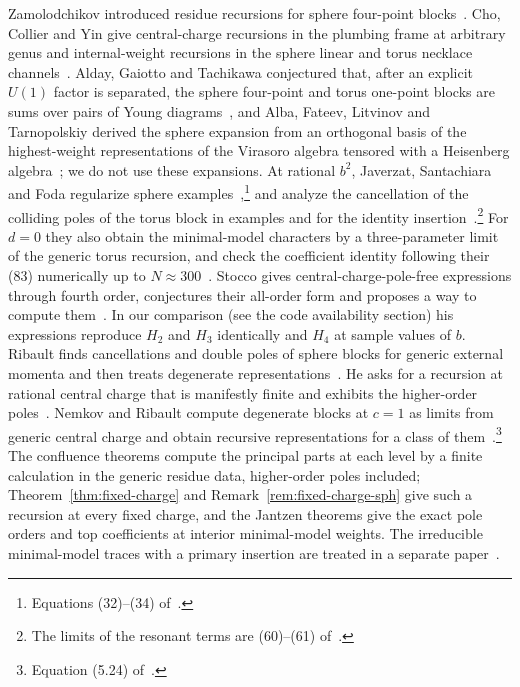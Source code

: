 \documentclass[twoside,10pt]{article}
\numberwithin{equation}{section}
\theoremstyle{slbody}
\theoremstyle{definition}
\theoremstyle{remark}
\begin{document}
Zamolodchikov introduced residue recursions for sphere four-point
blocks~\cite{Zamolodchikov1984,Zamolodchikov1987}.  Cho, Collier and Yin give
central-charge recursions in the plumbing frame at arbitrary genus and
internal-weight recursions in the sphere linear and torus necklace
channels~\cite{ChoCollierYin2017}.  Alday, Gaiotto and Tachikawa conjectured
that, after an explicit \(U(1)\) factor is separated, the sphere four-point
and torus one-point blocks are sums over pairs of Young
diagrams~\cite[\S\S3.2--3.3]{AldayGaiottoTachikawa2010}, and Alba, Fateev,
Litvinov and Tarnopolskiy derived the sphere expansion from an orthogonal
basis of the highest-weight representations of the Virasoro algebra tensored
with a Heisenberg algebra~\cite[Proposition~2.1, (1.9)
and~(1.11)--(1.12)]{AlbaFateevLitvinovTarnopolskiy2011}; we do not use these
expansions.  At rational \(b^2\), Javerzat,
Santachiara and Foda regularize sphere
examples~\cite[\S\S3.4--3.6]{JaverzatSantachiaraFoda2018},\footnote{Equations (32)--(34) of~\cite{JaverzatSantachiaraFoda2018}.}
and analyze the cancellation of the colliding poles of the torus block in
examples and for the identity
insertion~\cite[\S\S4--6]{JaverzatSantachiaraFoda2018}.\footnote{The limits of the resonant terms are (60)--(61) of~\cite{JaverzatSantachiaraFoda2018}.}
For \(d=0\) they also obtain the minimal-model characters by a
three-parameter limit of the generic torus recursion, and check the
coefficient identity following their (83) numerically up to
\(N\approx300\)~\cite[\S5]{JaverzatSantachiaraFoda2018}.
Stocco gives central-charge-pole-free expressions through fourth order,
conjectures their all-order form and proposes a way to compute
them~\cite[\S\S II.B--II.C and Appendix~A]{Stocco2022}.  In our comparison
(see the code availability section) his expressions reproduce \(H_2\) and
\(H_3\) identically and \(H_4\) at sample values of \(b\).  Ribault finds
cancellations and double poles of sphere blocks for generic external momenta
and then treats degenerate representations~\cite[\S\S3.2--3.3]{Ribault2019}.
He asks for a recursion at rational central charge that is manifestly finite
and exhibits the higher-order poles~\cite[end of \S3.2]{Ribault2019}.  Nemkov
and Ribault compute degenerate blocks at \(c=1\) as limits from generic
central charge and obtain recursive representations for a class of
them~\cite[\S5.2]{NemkovRibault2021}.\footnote{Equation (5.24)
of~\cite{NemkovRibault2021}.}  The confluence theorems compute the principal parts at each level by a finite
calculation in the generic residue data, higher-order poles included;
Theorem~\ref{thm:fixed-charge} and Remark~\ref{rem:fixed-charge-sph} give such
a recursion at every fixed charge, and the Jantzen theorems give the exact
pole orders and top coefficients at interior minimal-model weights.  The
irreducible minimal-model traces with a primary insertion are treated in a
separate paper~\cite{PolzerTraces2026}.
\end{document}
